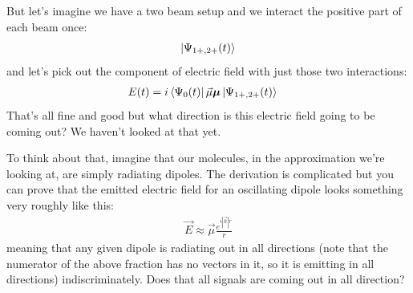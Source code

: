 But let's imagine we have a two beam setup and we interact the positive part of each beam once:
\begin{align}
   \ket{\Psi_{1+, 2+} (t)}
\end{align}
and let's pick out the component of electric field with just those two interactions:
\begin{align}
   E (t) &= i\bra{\Psi_0 (t) }\vec{\mu} \boldsymbol{\mu} \ket{\Psi_{1+, 2+} (t)}
\end{align}
That's all fine and good but what direction is this electric field going to be coming out?  We haven't looked at that yet.

To think about that, imagine that our molecules, in the approximation we're looking at, are simply radiating dipoles.  The derivation is complicated but you can prove that the emitted electric field for an oscillating dipole looks something very roughly like this:
\begin{align}
	\vec{E} \approx \vec{\mu} \frac{e^{i |\vec{k}| r}}{r}
\end{align}
meaning that any given dipole is radiating out in all directions (note that the numerator of the above fraction has no vectors in it, so it is emitting in all directions) indiscriminately.  Does that all signals are coming out in all direction?

